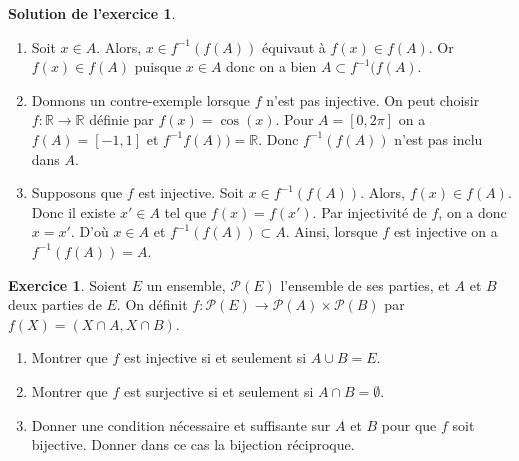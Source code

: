 \documentclass[a4paper, 11pt,openany]{article}%
\theoremstyle{plain}
\theoremstyle{definition}
\newtheorem{exo}{Exercice}
\newtheorem{sol}{Solution de l'exercice}
\theoremstyle{remark}
\begin{document}
\begin{sol}
\begin{enumerate}
 \item Soit $x\in A$. Alors, $x\in f^{-1}(f(A))$ équivaut à $f(x)\in f(A)$. Or $f(x)\in f(A)$ puisque $x\in A$ donc on a bien $A \subset f^{-1}(f(A)$. 
  \item Donnons un contre-exemple lorsque $f$ n'est pas injective. On peut choisir $f\colon \mathbb R \to \mathbb R$ définie par $f(x)=\cos(x)$. Pour $A=[0,2\pi]$ on a $f(A)=[-1,1]$ et $f^{-1}f(A))=\mathbb R$. Donc $f^{-1}(f(A))$ n'est pas inclu dans $A$.
 \item Supposons que $f$ est injective. Soit $x\in f^{-1}(f(A))$. Alors, $f(x)\in f(A)$. Donc il existe $x' \in A$ tel que $f(x)=f(x')$. Par injectivité de $f$, on a donc $x=x'$. D'où $x\in A$ et $f^{-1}(f(A)) \subset A$. Ainsi, lorsque $f$ est injective on a  $f^{-1}(f(A)) = A$.
\end{enumerate}
\end{sol}
   

\begin{exo}
Soient $E$ un ensemble, $\mathcal{P}(E)$ l'ensemble de ses parties, et $A$ et $B$ deux parties de $E$. On définit $f: \mathcal{P}(E) \to \mathcal{P}(A) \times  \mathcal{P}(B)$ par $f(X) = (X\cap A,X\cap B)$.
\begin{enumerate}
\item Montrer que $f$ est injective si et seulement si $A \cup B=E$.
\item Montrer que $f$ est surjective si et seulement si $A \cap B = \emptyset$.
\item Donner une condition nécessaire et suffisante sur $A$ et $B$ pour que $f$ soit bijective. Donner dans ce cas la bijection réciproque. 
\end{enumerate}
\end{exo}
\end{document}

